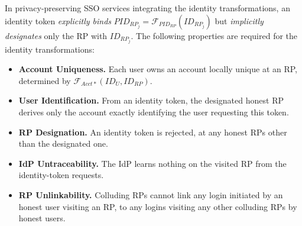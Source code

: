 In privacy-preserving SSO services integrating the identity transformations,
    an identity token \emph{explicitly binds} $PID_{RP_j} = \mathcal{F}_{PID_{RP}}(ID_{RP_j})$ but \emph{implicitly designates} only the RP with $ID_{RP_j}$.
The following properties are required for the identity transformations:
\begin{itemize}
\setlength{\topsep}{0pt}
\setlength{\partopsep}{0pt}
\setlength{\itemsep}{0pt}
\setlength{\parsep}{0pt}
\setlength{\parskip}{0pt}

\item \textbf{Account Uniqueness.} Each user owns an account locally unique at an RP, determined by $\mathcal{F}_{Acct\ast}(ID_{U}, ID_{RP})$.
\item \textbf{User Identification.} From an identity token,
    the designated honest RP derives only the account exactly identifying the user requesting this token.
\item \textbf{RP Designation.} 
An identity token is rejected, at any honest RPs other than the designated one.

\item \textbf{IdP Untraceability.}
The IdP learns nothing on the visited RP from the identity-token requests.

\item \textbf{RP Unlinkability.}
Colluding RPs 
 cannot link any login initiated by an honest user visiting an RP,
  to any logins visiting any other colluding RPs by honest users.
\end{itemize}

